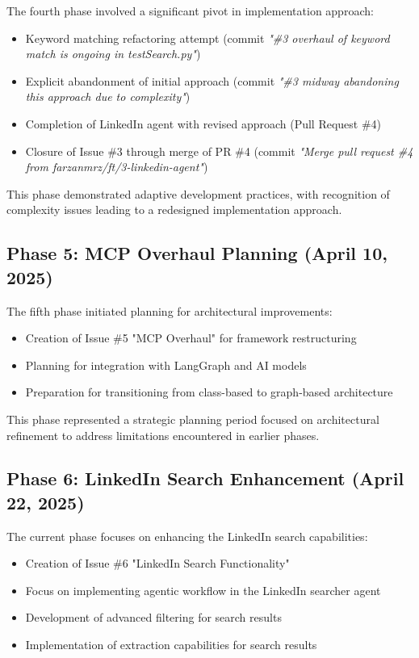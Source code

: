 \documentclass[a4paper,12pt]{article}
\begin{document}
The fourth phase involved a significant pivot in implementation approach:

\begin{itemize}
    \item Keyword matching refactoring attempt (commit \textit{"\#3 overhaul of keyword match is ongoing in testSearch.py"})
    \item Explicit abandonment of initial approach (commit \textit{"\#3 midway abandoning this approach due to complexity"})
    \item Completion of LinkedIn agent with revised approach (Pull Request \#4)
    \item Closure of Issue \#3 through merge of PR \#4 (commit \textit{"Merge pull request \#4 from farzanmrz/ft/3-linkedin-agent"})
\end{itemize}

This phase demonstrated adaptive development practices, with recognition of complexity issues leading to a redesigned implementation approach.

\subsection{Phase 5: MCP Overhaul Planning (April 10, 2025)}

The fifth phase initiated planning for architectural improvements:

\begin{itemize}
    \item Creation of Issue \#5 "MCP Overhaul" for framework restructuring
    \item Planning for integration with LangGraph and AI models
    \item Preparation for transitioning from class-based to graph-based architecture
\end{itemize}

This phase represented a strategic planning period focused on architectural refinement to address limitations encountered in earlier phases.

\subsection{Phase 6: LinkedIn Search Enhancement (April 22, 2025)}

The current phase focuses on enhancing the LinkedIn search capabilities:

\begin{itemize}
    \item Creation of Issue \#6 "LinkedIn Search Functionality" 
    \item Focus on implementing agentic workflow in the LinkedIn searcher agent
    \item Development of advanced filtering for search results
    \item Implementation of extraction capabilities for search results
\end{itemize}
\end{document}
